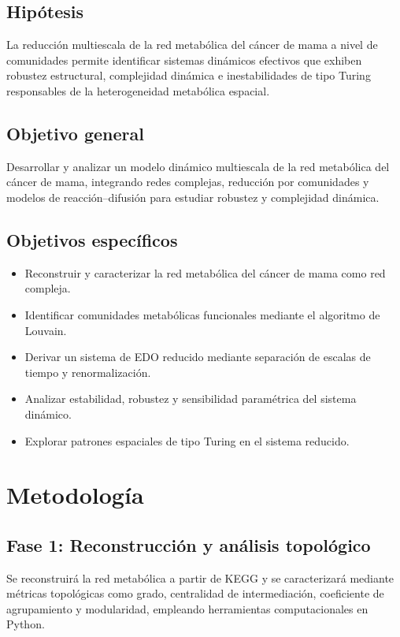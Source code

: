\documentclass[12pt,spanish]{article}
\begin{document}
	\subsection{Hipótesis}
	
	La reducción multiescala de la red metabólica del cáncer de mama a nivel de comunidades permite identificar sistemas dinámicos efectivos que exhiben robustez estructural, complejidad dinámica e inestabilidades de tipo Turing responsables de la heterogeneidad metabólica espacial.
	
	\subsection{Objetivo general}
	
	Desarrollar y analizar un modelo dinámico multiescala de la red metabólica del cáncer de mama, integrando redes complejas, reducción por comunidades y modelos de reacción--difusión para estudiar robustez y complejidad dinámica.
	
	\subsection{Objetivos específicos}
	
	\begin{itemize}
		\item Reconstruir y caracterizar la red metabólica del cáncer de mama como red compleja.
		\item Identificar comunidades metabólicas funcionales mediante el algoritmo de Louvain.
		\item Derivar un sistema de EDO reducido mediante separación de escalas de tiempo y renormalización.
		\item Analizar estabilidad, robustez y sensibilidad paramétrica del sistema dinámico.
		\item Explorar patrones espaciales de tipo Turing en el sistema reducido.
	\end{itemize}
	
	\section{Metodología}
	
	\subsection{Fase 1: Reconstrucción y análisis topológico}
	
	Se reconstruirá la red metabólica a partir de KEGG y se caracterizará mediante métricas topológicas como grado, centralidad de intermediación, coeficiente de agrupamiento y modularidad, empleando herramientas computacionales en Python.
	
\end{document}
